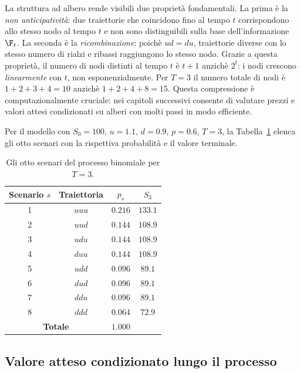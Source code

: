 La struttura ad albero rende visibili due propriet\`{a} fondamentali.
La prima \`{e} la \emph{non anticipativit\`{a}}: due traiettorie che
coincidono fino al tempo $t$ corrispondono allo stesso nodo al tempo
$t$ e non sono distinguibili sulla base dell'informazione $\F_t$. La
seconda \`{e} la \emph{ricombinazione}: poich\`{e} $ud=du$,
traiettorie diverse con lo stesso numero di rialzi e ribassi
raggiungono lo stesso nodo. Grazie a questa propriet\`{a}, il numero
di nodi distinti al tempo $t$ \`{e} $t+1$ anzich\`{e} $2^t$: i nodi
crescono \emph{linearmente} con $t$, non esponenzialmente. Per $T=3$
il numero totale di nodi \`{e} $1+2+3+4=10$ anzich\`{e}
$1+2+4+8=15$. Questa compressione \`{e} computazionalmente cruciale:
nei capitoli successivi consente di valutare prezzi e valori attesi
condizionati su alberi con molti passi in modo efficiente.

\begin{example}
\label{es:scenari-binomiale}
Per il modello con $S_0=100$, $u=1.1$, $d=0.9$, $p=0.6$, $T=3$, la
Tabella~\ref{tab:scenari-binomiale} elenca gli otto scenari con la
rispettiva probabilit\`{a} e il valore terminale.

\begin{table}[h]
\centering
\begin{tabular}{|c|c|c|c|}
\hline
\textbf{Scenario} $s$ & \textbf{Traiettoria} & $p_s$ & $S_3$\\
\hline
1 & $uuu$ & $0.216$ & $133.1$\\
2 & $uud$ & $0.144$ & $108.9$\\
3 & $udu$ & $0.144$ & $108.9$\\
4 & $duu$ & $0.144$ & $108.9$\\
5 & $udd$ & $0.096$ & $89.1$\\
6 & $dud$ & $0.096$ & $89.1$\\
7 & $ddu$ & $0.096$ & $89.1$\\
8 & $ddd$ & $0.064$ & $72.9$\\
\hline
\multicolumn{2}{|c|}{\textbf{Totale}} & $1.000$ & \\
\hline
\end{tabular}
\caption{Gli otto scenari del processo binomiale per $T=3$.}
\label{tab:scenari-binomiale}
\end{table}
\end{example}

\subsection{Valore atteso condizionato lungo il processo}

